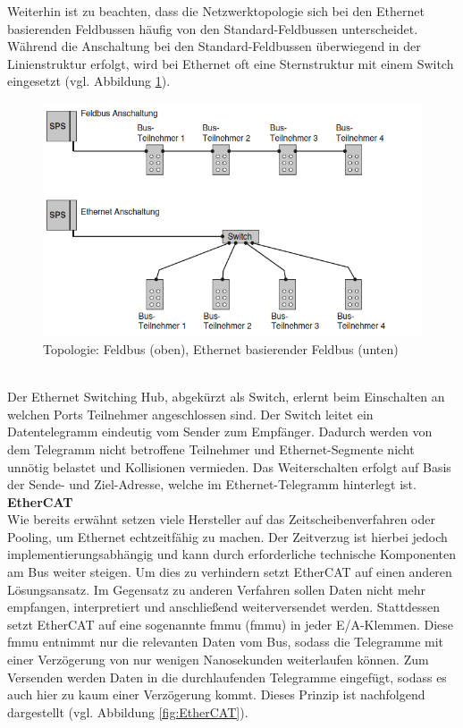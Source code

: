 \documentclass[ a4paper,
                oneside,
                toc=bibliography,
                toc=listof
                ]{scrbook}
\begin{document}
	Weiterhin ist zu beachten, dass die Netzwerktopologie sich bei den Ethernet basierenden Feldbussen häufig von den Standard-Feldbussen unterscheidet. Während die Anschaltung bei den Standard-Feldbussen überwiegend in der Linienstruktur erfolgt, wird bei Ethernet oft eine Sternstruktur mit einem Switch eingesetzt (vgl. Abbildung \ref{fig:TopologieEthernet}).
	\begin{figure}[!ht]
		\centering
		\includegraphics[width=1.0\linewidth]{./images/Feldbus vs Ethernet Anschaltung.png}
		\caption{Topologie: Feldbus (oben), Ethernet basierender Feldbus (unten) \cite{hering2012elektrotechnik}}
		\label{fig:TopologieEthernet}
	\end{figure}\\
	Der Ethernet Switching Hub, abgekürzt als Switch, erlernt beim Einschalten an welchen Ports Teilnehmer angeschlossen sind. Der Switch leitet ein Datentelegramm eindeutig vom Sender zum Empfänger. Dadurch werden von dem Telegramm nicht betroffene Teilnehmer und Ethernet-Segmente nicht unnötig belastet und Kollisionen vermieden. Das Weiterschalten erfolgt auf Basis der Sende- und Ziel-Adresse, welche im Ethernet-Telegramm hinterlegt ist. \cite{hering2012elektrotechnik} \\
	\clearpage
	\noindent
	\textbf{EtherCAT} \\
	Wie bereits erwähnt setzen viele Hersteller auf das Zeitscheibenverfahren oder Pooling, um Ethernet echtzeitfähig zu machen. Der Zeitverzug ist hierbei jedoch implementierungsabhängig und kann durch erforderliche technische Komponenten am Bus weiter steigen. Um dies zu verhindern setzt EtherCAT auf einen anderen Lösungsansatz. Im Gegensatz zu anderen Verfahren sollen Daten nicht mehr empfangen, interpretiert und anschließend weiterversendet werden. Stattdessen setzt EtherCAT auf eine sogenannte \acs{fmmu} (\acl{fmmu}) in jeder E/A-Klemmen. Diese \acs{fmmu} entnimmt nur die relevanten Daten vom Bus, sodass die Telegramme mit einer Verzögerung von nur wenigen Nanosekunden weiterlaufen können. Zum Versenden werden Daten in die durchlaufenden Telegramme eingefügt, sodass es auch hier zu kaum einer Verzögerung kommt. Dieses Prinzip ist nachfolgend dargestellt (vgl. Abbildung \ref{fig:EtherCAT}).
\end{document}
